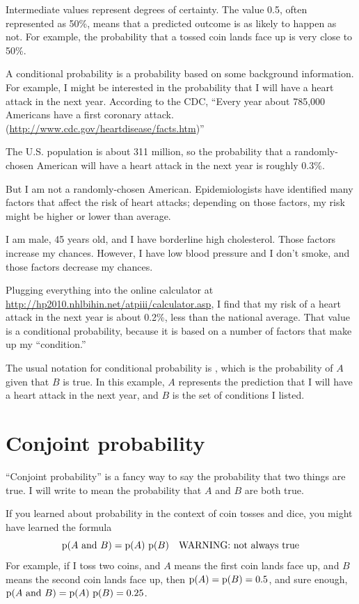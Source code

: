 \documentclass[12pt]{book}
\begin{document}
Intermediate values represent degrees of certainty.  The value 0.5,
often represented as 50\%, means that a predicted outcome is
as likely to happen as not.  For example, the probability that a tossed
coin lands face up is very close to 50\%.

A conditional probability is a probability based on some background
information.  For example, I might be interested in the probability
that I will have a heart attack in the next year.  According to the
CDC, ``Every year about 785,000 Americans have a first coronary attack.
(\url{http://www.cdc.gov/heartdisease/facts.htm})''

The U.S. population is about 311 million, so the probability that a
randomly-chosen American will have a heart attack in the next year is
roughly 0.3\%.

But I am not a randomly-chosen American.  Epidemiologists have
identified many factors that affect the risk of heart attacks;
depending on those factors, my risk might be higher or lower than
average.

I am male, 45 years old, and I have borderline high cholesterol.
Those factors increase my chances.  However, I have low blood pressure
and I don't smoke, and those factors decrease my chances.

Plugging everything into the online calculator at
\url{http://hp2010.nhlbihin.net/atpiii/calculator.asp}, I find that my
risk of a heart attack in the next year is about 0.2\%, less than the
national average.  That value is a conditional probability, because it
is based on a number of factors that make up my ``condition.''

The usual notation for conditional probability is , which
is the probability of $A$ given that $B$ is true.  In this
example, $A$ represents the prediction that I will have a heart
attack in the next year, and $B$ is the set of conditions I listed.


\section{Conjoint probability}

``Conjoint probability'' is a fancy way to say the probability that
two things are true.  I will write  to mean the
probability that $A$ and $B$ are both true.

If you learned about probability in the context of coin tosses and
dice, you might have learned the formula
%
\[ \mathrm{p}(A ~\mathrm{and}~ B) = \mathrm{p}(A)~\mathrm{p}(B) \quad\mbox{WARNING: not always true}\]
%
For example, if I toss two coins, and $A$ means the first coin lands
face up, and $B$ means the second coin lands face up, then $\mathrm{p}(A) =
\mathrm{p}(B) = 0.5$, and sure enough, $\mathrm{p}(A ~\mathrm{and}~ B) = \mathrm{p}(A)~\mathrm{p}(B) = 0.25$.
\end{document}
